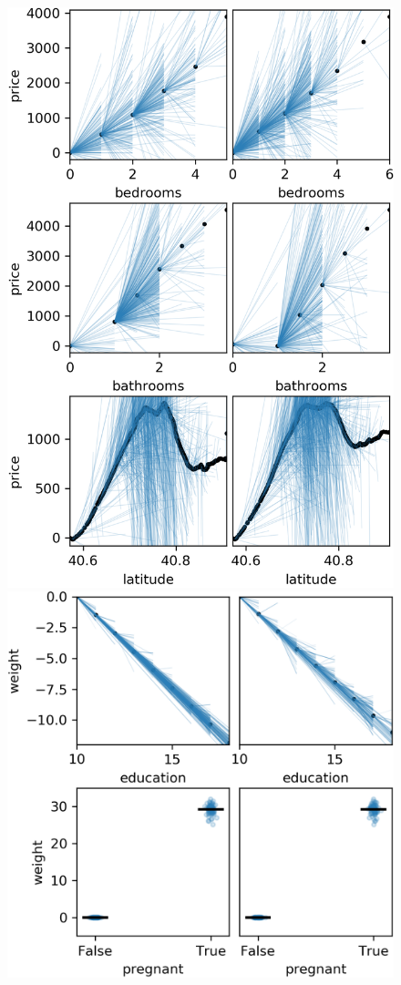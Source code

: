 \documentclass[12pt]{article}
\begin{document}
\begin{figure}[htbp]
\begin{center}
\includegraphics[scale=0.7]{images/rent_unsup.png}
\includegraphics[scale=0.7]{images/weight_unsup.png}

\end{center}
\end{figure}
\end{document}
